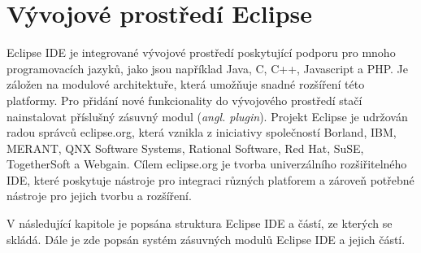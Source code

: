 \chapter{Vývojové prostředí Eclipse}                                      %
Eclipse IDE je integrované vývojové prostředí poskytující podporu pro mnoho programovacích jazyků, jako jsou například Java, C, C++, Javascript a PHP.  Je záložen na modulové architektuře, která umožňuje snadné rozšíření této platformy. Pro přidání nové funkcionality do vývojového prostředí stačí nainstalovat příslušný zásuvný modul (\emph{angl. plugin}). Projekt Eclipse je udržován radou správců eclipse.org, která vznikla z iniciativy společností Borland, IBM, MERANT, QNX Software Systems, Rational Software, Red Hat, SuSE, TogetherSoft a Webgain. Cílem eclipse.org je tvorba univerzálního rozšiřitelného IDE, které poskytuje nástroje pro integraci různých platforem a zároveň potřebné nástroje pro jejich tvorbu a rozšíření. \cite{eclipse-org}

V následující kapitole je popsána struktura Eclipse IDE a částí, ze kterých se skládá. Dále je zde popsán systém zásuvných modulů Eclipse IDE a jejich částí.

